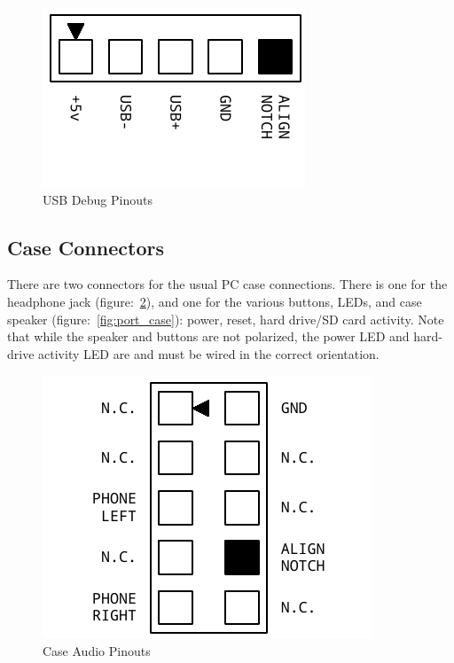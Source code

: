 \begin{figure}[ht]
    \begin{center}
        \includegraphics[scale=0.65]{images/f256_port_usb.pdf}
    \end{center}
    \caption{USB Debug Pinouts}
    \label{fig:port_usb}
\end{figure}

\subsection*{Case Connectors}

There are two connectors for the usual PC case connections. There is one for the headphone jack (figure:~\ref{fig:port_audio}), and one for the various buttons, LEDs, and case speaker (figure:~\ref{fig:port_case}): power, reset, hard drive/SD card activity. Note that while the speaker and buttons are not polarized, the power LED and hard-drive activity LED are and must be wired in the correct orientation.

\begin{figure}[ht]
    \begin{center}
        \includegraphics[scale=0.65]{images/f256_port_audio.pdf}
    \end{center}
    \caption{Case Audio Pinouts}
    \label{fig:port_audio}
\end{figure}

